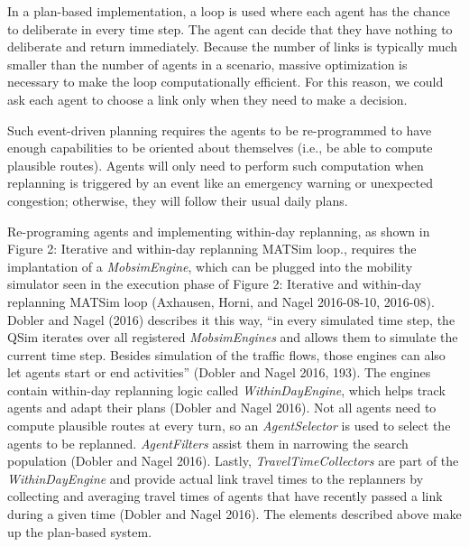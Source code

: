 \documentclass[
  letterpaper,
  DIV=11,
  numbers=noendperiod]{scrreprt}
\begin{document}
In a plan-based implementation, a loop is used where each agent has the
chance to deliberate in every time step. The agent can decide that they
have nothing to deliberate and return immediately. Because the number of
links is typically much smaller than the number of agents in a scenario,
massive optimization is necessary to make the loop computationally
efficient. For this reason, we could ask each agent to choose a link
only when they need to make a decision.

Such event-driven planning requires the agents to be re-programmed to
have enough capabilities to be oriented about themselves (i.e., be able
to compute plausible routes). Agents will only need to perform such
computation when replanning is triggered by an event like an emergency
warning or unexpected congestion; otherwise, they will follow their
usual daily plans.

Re-programing agents and implementing within-day replanning, as shown in
Figure 2: Iterative and within-day replanning MATSim loop., requires the
implantation of a \emph{MobsimEngine}, which can be plugged into the
mobility simulator seen in the execution phase of Figure 2: Iterative
and within-day replanning MATSim loop (Axhausen, Horni, and Nagel
2016-08-10, 2016-08). Dobler and Nagel (2016) describes it this way,
``in every simulated time step, the QSim iterates over all registered
\emph{MobsimEngines} and allows them to simulate the current time step.
Besides simulation of the traffic flows, those engines can also let
agents start or end activities'' (Dobler and Nagel 2016, 193). The
engines contain within-day replanning logic called
\emph{WithinDayEngine}, which helps track agents and adapt their plans
(Dobler and Nagel 2016). Not all agents need to compute plausible routes
at every turn, so an \emph{AgentSelector} is used to select the agents
to be replanned. \emph{AgentFilters} assist them in narrowing the search
population (Dobler and Nagel 2016). Lastly, \emph{TravelTimeCollectors}
are part of the \emph{WithinDayEngine} and provide actual link travel
times to the replanners by collecting and averaging travel times of
agents that have recently passed a link during a given time (Dobler and
Nagel 2016). The elements described above make up the plan-based system.
\end{document}
